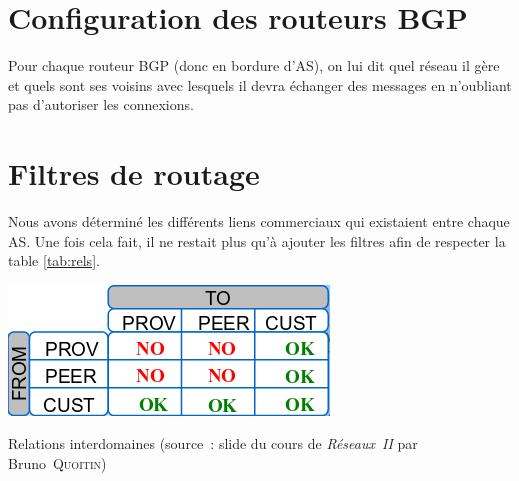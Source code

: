 \documentclass[10pt,a4paper,twocolumn]{article}
\begin{document}
\section{Configuration des routeurs BGP}
Pour chaque routeur BGP (donc en bordure d'AS), on lui dit quel réseau il gère et quels sont ses voisins avec lesquels il devra échanger des messages en n'oubliant pas d'autoriser les connexions.

\section{Filtres de routage}
Nous avons déterminé les différents liens commerciaux qui existaient entre chaque AS. Une fois cela fait, il ne restait plus qu'à ajouter les filtres afin de respecter la table \ref{tab:rels}.
\begin{table}[h]
	\center
	\includegraphics[width=0.5\columnwidth]{comlink.png}
	\caption{Relations interdomaines (source~: slide du cours de \textit{Réseaux~II} par Bruno~\textsc{Quoitin})}
	\label{tab:rels}
\end{table}
\end{document}
